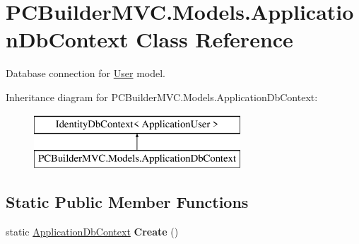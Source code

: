\hypertarget{class_p_c_builder_m_v_c_1_1_models_1_1_application_db_context}{}\section{P\+C\+Builder\+M\+V\+C.\+Models.\+Application\+Db\+Context Class Reference}
\label{class_p_c_builder_m_v_c_1_1_models_1_1_application_db_context}


Database connection for \hyperlink{class_p_c_builder_m_v_c_1_1_models_1_1_user}{User} model.  


Inheritance diagram for P\+C\+Builder\+M\+V\+C.\+Models.\+Application\+Db\+Context\+:\begin{figure}[H]
\begin{center}
\leavevmode
\includegraphics[height=2.000000cm]{class_p_c_builder_m_v_c_1_1_models_1_1_application_db_context}
\end{center}
\end{figure}
\subsection*{Static Public Member Functions}
\begin{DoxyCompactItemize}
\item 
static \hyperlink{class_p_c_builder_m_v_c_1_1_models_1_1_application_db_context}{Application\+Db\+Context} {\bfseries Create} ()\hypertarget{class_p_c_builder_m_v_c_1_1_models_1_1_application_db_context_a87e83c7a94db34abb35a1e6d7df4c6e3}{}\label{class_p_c_builder_m_v_c_1_1_models_1_1_application_db_context_a87e83c7a94db34abb35a1e6d7df4c6e3}

\end{DoxyCompactItemize}
